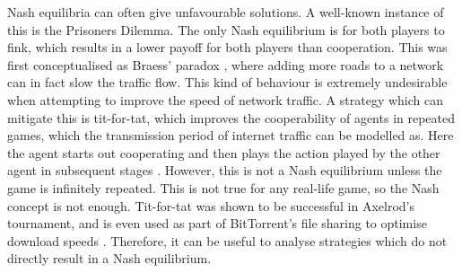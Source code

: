 \documentclass{article}
\begin{document}
\begin{multicols}{2}
Nash equilibria can often give unfavourable solutions. A well-known instance of this is the Prisoners Dilemma. The only Nash equilibrium is for both players to fink, which results in a lower payoff for both players than cooperation. This was first conceptualised as Braess’ paradox \cite{braess_paradox_2005}, where adding more roads to a network can in fact slow the traffic flow. This kind of behaviour is extremely undesirable when attempting to improve the speed of network traffic. A strategy which can mitigate this is tit-for-tat, which improves the cooperability of agents in repeated games, which the transmission period of internet traffic can be modelled as. Here the agent starts out cooperating and then plays the action played by the other agent in subsequent stages \cite{beyond_nash}. However, this is not a Nash equilibrium unless the game is infinitely repeated. This is not true for any real-life game, so the Nash concept is not enough. Tit-for-tat was shown to be successful in Axelrod’s tournament, and is even used as part of BitTorrent’s file sharing to optimise download speeds \cite{cohen_incentives_2003}. Therefore, it can be useful to analyse strategies which do not directly result in a Nash equilibrium.




\printbibliography
\end{multicols}
\end{document}
